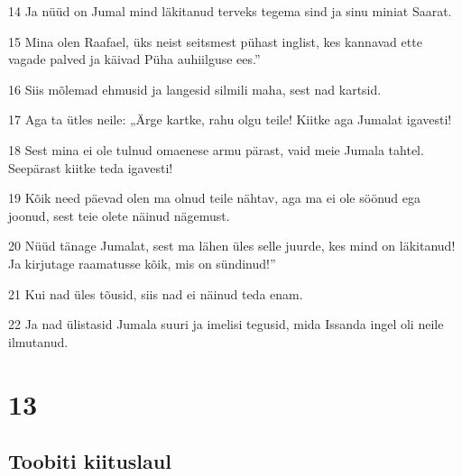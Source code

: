 \par 14 Ja nüüd on Jumal mind läkitanud terveks tegema sind ja sinu  miniat Saarat.
\par 15 Mina olen Raafael, üks neist seitsmest pühast inglist, kes  kannavad ette vagade palved ja käivad Püha auhiilguse ees.”
\par 16 Siis mõlemad ehmusid ja langesid silmili maha, sest nad  kartsid.
\par 17 Aga ta ütles neile: „Ärge kartke, rahu olgu teile! Kiitke  aga Jumalat igavesti!
\par 18 Sest mina ei ole tulnud omaenese armu pärast, vaid meie Jumala  tahtel. Seepärast kiitke teda igavesti!
\par 19 Kõik need päevad olen ma olnud teile nähtav, aga ma ei ole söönud  ega joonud, sest teie olete näinud nägemust.
\par 20 Nüüd tänage Jumalat, sest ma lähen üles selle juurde, kes mind  on läkitanud! Ja kirjutage raamatusse kõik, mis on sündinud!”
\par 21 Kui nad üles tõusid, siis nad ei näinud teda enam.
\par 22 Ja nad ülistasid Jumala suuri ja imelisi tegusid, mida Issanda  ingel oli neile ilmutanud.

\chapter{13}

\section*{Toobiti kiituslaul}

